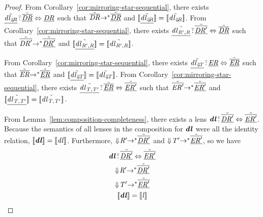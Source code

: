 \documentclass[numbers,10pt,preprint\ifanon ,nocopyrightspace\fi]{sigplanconf}
\begin{document}
\begin{proof}
  From Corollary~\ref{cor:mirroring-star-sequential}, there
  exists $\underline{\tilde{\mathit{dl}_{\Downarrow\mkern-4mu \mathit{R}}}}
  \,\tilde{:}\, \underline{\tilde{\overline{\mathit{DR}}}}
  \Leftrightarrow \underline{\mathit{DR}}$ such that $\tilde{\overline{\mathit{DR}}}
  {\rightarrow}^* \underline{\tilde{\overline{\mathit{DR}}}}$ and
  $[ \! [\underline{\tilde{\mathit{dl}_{\Downarrow\mkern-4mu \mathit{R}}}}] \! ] =
  [ \! [\tilde{\mathit{dl}_{\Downarrow\mkern-4mu \mathit{R}}}] \! ]$.
  From Corollary~\ref{cor:mirroring-star-sequential}, there
  exists $\underline{\tilde{\mathit{dl}_{\mathit{R}',\mathit{R}}}}
  \,\tilde{:}\, \underline{\tilde{\overline{\mathit{DR}'}}}
  \Leftrightarrow \underline{\tilde{\overline{\mathit{DR}}}}$
  such that $\tilde{\overline{\mathit{DR}'}}
  {\rightarrow}^* \underline{\tilde{\overline{\mathit{DR}'}}}$ and
  $[ \! [\underline{\tilde{\mathit{dl}_{\mathit{R}',\mathit{R}}}}] \! ] =
  [ \! [\tilde{\mathit{dl}_{\mathit{R}',\mathit{R}}}] \! ]$.
  
  From Corollary~\ref{cor:mirroring-star-sequential}, there
  exists $\underline{\tilde{\mathit{dl}_{\Downarrow\mkern-4mu \mathit{T}}}}
  \,\tilde{:}\, \underline{\mathit{ER}}
  \Leftrightarrow \underline{\tilde{\overline{\mathit{ER}}}}$ such that
  $\tilde{\overline{\mathit{ER}}}
  {\rightarrow}^* \underline{\tilde{\overline{\mathit{ER}}}}$ and
  $[ \! [\underline{\tilde{\mathit{dl}_{\Downarrow\mkern-4mu \mathit{T}}}}] \! ] =
  [ \! [\tilde{\mathit{dl}_{\Downarrow\mkern-4mu \mathit{T}}}] \! ]$.
  From Corollary~\ref{cor:mirroring-star-sequential}, there
  exists $\underline{\tilde{\mathit{dl}_{\mathit{T},\mathit{T}'}}}
  \,\tilde{:}\, \underline{\tilde{\overline{\mathit{ER}}}}
  \Leftrightarrow \underline{\tilde{\overline{\mathit{ER}'}}}$
  such that $\tilde{\overline{\mathit{ER}'}}
  {\rightarrow}^* \underline{\tilde{\overline{\mathit{ER}'}}}$ and
  $[ \! [\underline{\tilde{\mathit{dl}_{\mathit{T},\mathit{T}'}}}] \! ] =
  [ \! [\tilde{\mathit{dl}_{\mathit{T},\mathit{T}'}}] \! ]$.

  From Lemma~\ref{lem:composition-completeness}, there exists a lens
  $\boldsymbol{\mathit{dl}} \,\tilde{:}\,
  \underline{\tilde{\overline{\mathit{DR}'}}} \Leftrightarrow
  \underline{\tilde{\overline{\mathit{ER}'}}}$.  Because the semantics of all
  lenses in the composition for $\boldsymbol{\mathit{dl}}$ were all the identity
  relation, $[ \! [\boldsymbol{\mathit{dl}}] \! ] = [ \! [\mathit{dl}] \! ]$.
  Furthermore,
  $\Downarrow\mkern-4mu \mathit{R}' {\rightarrow}^*
  \underline{\tilde{\overline{\mathit{DR}'}}}$
  and
  $\Downarrow\mkern-4mu \mathit{T}' {\rightarrow}^*
  \underline{\tilde{\overline{\mathit{ER}'}}}$, so we have
  \begin{gather*}
    \boldsymbol{\DNFLens} \OfRewritelessType
    \underline{\tilde{\overline{\DNFRegex'}}} \Leftrightarrow
    \underline{\tilde{\overline{\DNFRegexAlt'}}}\\
    \ToDNFRegexOf{\Regex'} \StarOf{\Rewrite}
    \underline{\tilde{\overline{\DNFRegex'}}}\\
    \ToDNFRegexOf{\RegexAlt'} \StarOf{\Rewrite}
    \underline{\tilde{\overline{\DNFRegexAlt'}}}\\
    \SemanticsOf{\boldsymbol{\DNFLens}} = \SemanticsOf{\Lens}
  \end{gather*}
\end{proof}
\end{document}
